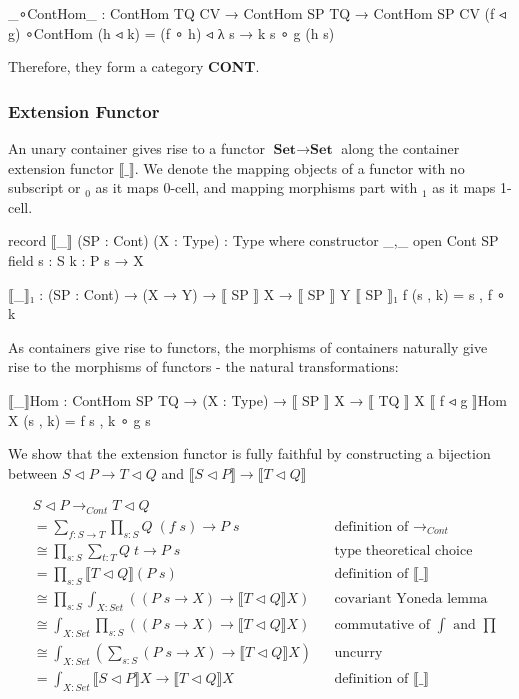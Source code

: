 {\begin{code}
_∘ContHom_ : ContHom TQ CV → ContHom SP TQ → ContHom SP CV
(f ◃ g) ∘ContHom (h ◃ k) = (f ∘ h) ◃ λ s → k s ∘ g (h s)
\end{code}

Therefore, they form a category \textbf{CONT}.

\subsubsection*{Extension Functor}

An unary container gives rise to a functor $\textbf{Set} \to \textbf{Set}$ along the container extension functor $\llbracket\_\rrbracket$. We denote the mapping objects of a functor with no subscript or $_0$ as it maps 0-cell, and mapping morphisms part with $_1$ as it maps 1-cell.

\begin{code}
record ⟦_⟧ (SP : Cont) (X : Type) : Type where
  constructor _,_
  open Cont SP
  field
    s : S
    k : P s → X

⟦_⟧₁ : (SP : Cont) → (X → Y) → ⟦ SP ⟧ X → ⟦ SP ⟧ Y
⟦ SP ⟧₁ f (s , k) = s , f ∘ k
\end{code}

As containers give rise to functors, the morphisms of containers naturally give rise to the morphisms of functors - the natural transformations:

\begin{code}
⟦_⟧Hom : ContHom SP TQ → (X : Type) → ⟦ SP ⟧ X → ⟦ TQ ⟧ X
⟦ f ◃ g ⟧Hom X (s , k) = f s , k ∘ g s
\end{code}

We show that the extension functor is fully faithful by constructing a bijection between $S \triangleleft P \to T \triangleleft Q$ and $\llbracket S \triangleleft P \rrbracket \to \llbracket T \triangleleft Q \rrbracket$

\begin{align*}
& S \triangleleft P \rightarrow_{Cont} T \triangleleft Q \\
&= \sum_{f : S \to T} \prod_{s : S} Q \; (f \; s) \to P \; s && \text{definition of $\rightarrow_{Cont}$} \\
&\cong \prod_{s : S} \sum_{t : T} Q \; t \to P \; s && \text{type theoretical choice} \\
&= \prod_{s : S} \llbracket T \triangleleft Q \rrbracket (P \; s) && \text{definition of $\llbracket \_ \rrbracket$} \\
&\cong \prod_{s : S} \int_{X : Set} ((P \; s \to X) \to \llbracket T \triangleleft Q \rrbracket X) && \text{covariant Yoneda lemma} \\
&\cong \int_{X : Set} \prod_{s : S} ((P \; s \to X) \to \llbracket T \triangleleft Q \rrbracket X) && \text{commutative of $\int$ and $\prod$} \\
&\cong \int_{X : Set} (\sum_{s : S} (P \; s \to X) \to \llbracket T \triangleleft Q \rrbracket X) && \text{uncurry} \\
&= \int_{X : Set} \llbracket S \triangleleft P \rrbracket X \to \llbracket T \triangleleft Q \rrbracket X && \text{definition of $\llbracket \_ \rrbracket$} \\
\end{align*}

}
